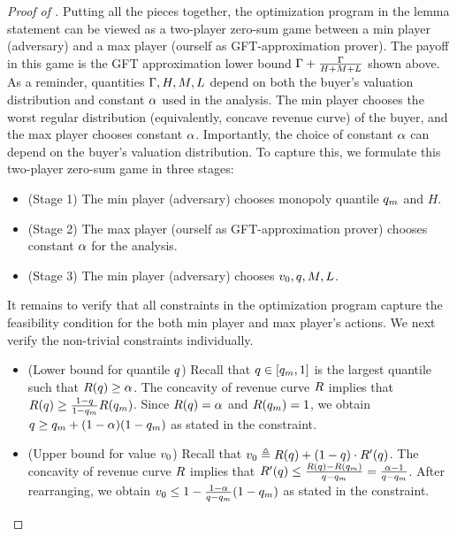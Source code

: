 \begin{proof}[Proof of ]
     Putting all the pieces together, the optimization program in the lemma statement can be viewed as a two-player zero-sum game between a min player (adversary) and a max player (ourself as GFT-approximation prover). The payoff in this game is the GFT approximation lower bound $\Gamma + \frac{\Gamma}{H + M + L}$ shown above. As a reminder, quantities $\Gamma, H, M, L$ depend on both the buyer's valuation distribution and constant $\alpha$ used in the analysis. The min player chooses the worst regular distribution (equivalently, concave revenue curve) of the buyer, and the max player chooses constant $\alpha$. Importantly, the choice of constant $\alpha$ can depend on the buyer's valuation distribution. To capture this, we formulate this two-player zero-sum game in three stages: 
    \begin{itemize}
        \item (Stage 1) The min player (adversary) chooses monopoly quantile $q_m$ and $H$.
        \item (Stage 2) The max player (ourself as GFT-approximation prover) chooses constant $\alpha$ for the analysis.
        \item (Stage 3) The min player (adversary) chooses $v_0, q, M, L$.
    \end{itemize}
    It remains to verify that all constraints in the optimization program capture the feasibility condition for the both min player and max player's actions. We next verify the non-trivial constraints individually. 
    \begin{itemize}
        \item (Lower bound for quantile $q$) Recall that $q\in[q_m, 1]$ is the largest quantile such that $R(q) \geq \alpha$. 
        The concavity of revenue curve $R$ implies that $R(q) \geq \frac{1-q}{1-q_m}R(q_m)$. Since $R(q) = \alpha$ and $R(q_m) = 1$, we obtain $q\geq q_m + (1 - \alpha)(1 - q_m)$ as stated in the constraint.
        \item (Upper bound for value $v_0$) Recall that $v_0 \triangleq R(q) + (1-q)\cdot R'(q)$. The concavity of revenue curve $R$ implies that $R'(q) \leq \frac{R(q) - R(q_m)}{q - q_m} = \frac{\alpha - 1}{q - q_m}$. After rearranging, we obtain $v_0 \leq 1 - \frac{1 - \alpha}{q - q_m}(1 - q_m)$ as stated in the constraint.

\end{itemize}
\end{proof}
